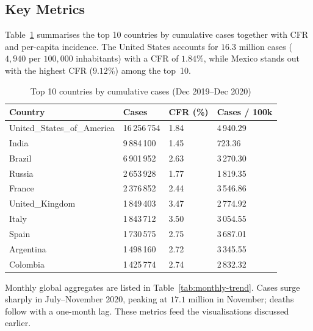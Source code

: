 \documentclass[12pt, a4paper]{article}
\begin{document}
\subsection{Key Metrics}
Table~\ref{tab:top-countries} summarises the top 10 countries by cumulative cases together with CFR and per-capita incidence. The United States accounts for $16.3$ million cases ($4{,}940$ per $100{,}000$ inhabitants) with a CFR of $1.84\%$, while Mexico stands out with the highest CFR ($9.12\%$) among the top~10.

\begin{table}[H]
    \centering
    \caption{Top 10 countries by cumulative cases (Dec 2019--Dec 2020)}
    \label{tab:top-countries}
    \begin{tabular}{@{}p{3.5cm}p{2.2cm}p{2.2cm}p{2.2cm}@{}}
        \toprule
        Country & Cases & CFR (\%) & Cases / 100k \\
        \midrule
        United\_States\_of\_America & 16\,256\,754 & 1.84 & 4\,940.29 \\
        India & 9\,884\,100 & 1.45 & 723.36 \\
        Brazil & 6\,901\,952 & 2.63 & 3\,270.30 \\
        Russia & 2\,653\,928 & 1.77 & 1\,819.35 \\
        France & 2\,376\,852 & 2.44 & 3\,546.86 \\
        United\_Kingdom & 1\,849\,403 & 3.47 & 2\,774.92 \\
        Italy & 1\,843\,712 & 3.50 & 3\,054.55 \\
        Spain & 1\,730\,575 & 2.75 & 3\,687.01 \\
        Argentina & 1\,498\,160 & 2.72 & 3\,345.55 \\
        Colombia & 1\,425\,774 & 2.74 & 2\,832.32 \\
        \bottomrule
    \end{tabular}
\end{table}

Monthly global aggregates are listed in Table~\ref{tab:monthly-trend}. Cases surge sharply in July--November 2020, peaking at $17.1$ million in November; deaths follow with a one-month lag. These metrics feed the visualisations discussed earlier.
\end{document}
